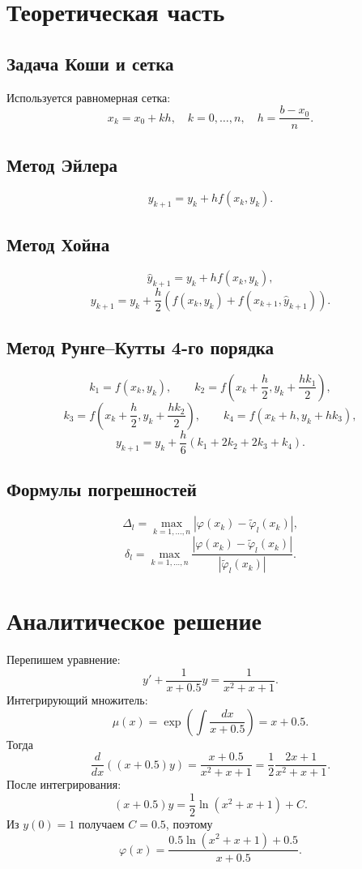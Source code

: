 \documentclass[12pt,a4paper]{article}
\begin{document}
\section{Теоретическая часть}
\subsection{Задача Коши и сетка}
Используется равномерная сетка:
\[
x_k=x_0+kh,\quad k=0,\dots,n,\quad h=\frac{b-x_0}{n}.
\]

\subsection{Метод Эйлера}
\[
y_{k+1}=y_k+h f(x_k,y_k).
\]

\subsection{Метод Хойна}
\[
\hat y_{k+1}=y_k+h f(x_k,y_k),
\]
\[
y_{k+1}=y_k+\frac{h}{2}\left(f(x_k,y_k)+f(x_{k+1},\hat y_{k+1})\right).
\]

\subsection{Метод Рунге--Кутты 4-го порядка}
\[
k_1=f(x_k,y_k),\qquad
k_2=f\left(x_k+\frac{h}{2},y_k+\frac{h k_1}{2}\right),
\]
\[
k_3=f\left(x_k+\frac{h}{2},y_k+\frac{h k_2}{2}\right),\qquad
k_4=f(x_k+h,y_k+h k_3),
\]
\[
y_{k+1}=y_k+\frac{h}{6}(k_1+2k_2+2k_3+k_4).
\]

\subsection{Формулы погрешностей}
\[
\Delta_l=\max_{k=1,\ldots,n}\left|\varphi(x_k)-\widetilde{\varphi}_l(x_k)\right|,
\]
\[
\delta_l=\max_{k=1,\ldots,n}
\frac{\left|\varphi(x_k)-\widetilde{\varphi}_l(x_k)\right|}
{\left|\widetilde{\varphi}_l(x_k)\right|}.
\]

\section{Аналитическое решение}
Перепишем уравнение:
\[
y' + \frac{1}{x+0.5}y=\frac{1}{x^2+x+1}.
\]
Интегрирующий множитель:
\[
\mu(x)=\exp\left(\int\frac{dx}{x+0.5}\right)=x+0.5.
\]
Тогда
\[
\frac{d}{dx}\left((x+0.5)y\right)=\frac{x+0.5}{x^2+x+1}
=\frac{1}{2}\frac{2x+1}{x^2+x+1}.
\]
После интегрирования:
\[
(x+0.5)y=\frac{1}{2}\ln(x^2+x+1)+C.
\]
Из $y(0)=1$ получаем $C=0.5$, поэтому
\[
\varphi(x)=\frac{0.5\ln(x^2+x+1)+0.5}{x+0.5}.
\]
\end{document}
